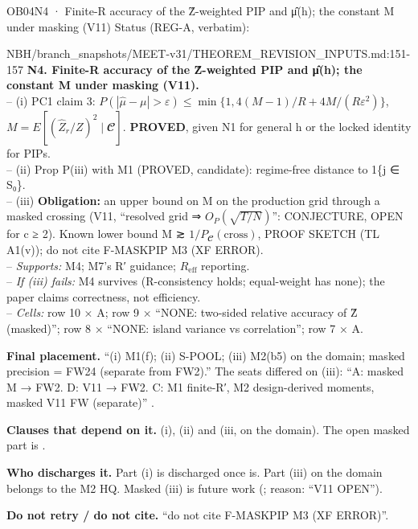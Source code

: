 \begin{card}{OB04}{N4 · Finite-R accuracy of the Ẑ-weighted PIP and μ̂(h); the constant M under masking (V11)}
Status (REG-A, verbatim):  
\begin{stmt}{NBH/branch_snapshots/MEET-v31/THEOREM_REVISION_INPUTS.md:151-157}
\textbf{N4. Finite-R accuracy of the Ẑ-weighted PIP and μ̂(h); the constant M under masking (V11).}\\
– (i) PC1 claim 3: $P(|\hat{μ} − μ| > ε) ≤ \min\{1, 4(M−1)/R + 4M/(Rε^2)\}$, $M = E[(\hat{Z}_r/Z)^2 \mid 𝓒]$. \textbf{PROVED}, given N1 for general h or the locked identity for PIPs.\\
– (ii) Prop P(iii) with M1 (PROVED, candidate): regime-free distance to 1\{j ∈ S₀\}.\\
– (iii) \textbf{Obligation:} an upper bound on M on the production grid through a masked crossing (V11, ``resolved grid ⇒ $O_P(\sqrt{T/N})$'': CONJECTURE, OPEN for c ≥ 2). Known lower bound M ≳ $1/P_{𝓒}(\mathrm{cross})$, PROOF SKETCH (TL A1(v)); do not cite F-MASKPIP M3 (XF ERROR).\\
– \emph{Supports:} M4; M7's R′ guidance; $R_{\mathrm{eff}}$ reporting.\\
– \emph{If (iii) fails:} M4 survives (R-consistency holds; equal-weight has none); the paper claims correctness, not efficiency.\\
– \emph{Cells:} row 10 × A; row 9 × ``NONE: two-sided relative accuracy of Ẑ (masked)''; row 8 × ``NONE: island variance vs correlation''; row 7 × A.
\end{stmt}
\textbf{Final placement.} ``(i) M1(f); (ii) S-POOL; (iii) M2(b5) on the domain; masked precision = FW24 (separate from FW2).'' The seats differed on (iii): ``A: masked M → FW2. D: V11 → FW2. C: M1 finite-R′, M2 design-derived moments, masked V11 FW (separate)'' .

\textbf{Clauses that depend on it.}  (i),  (ii) and  (iii, on the domain). The open masked part is .

\textbf{Who discharges it.} Part (i) is discharged once  is. Part (iii) on the domain belongs to the M2 HQ. Masked (iii) is future work (; reason: ``V11 OPEN'').

\textbf{Do not retry / do not cite.} ``do not cite F-MASKPIP M3 (XF ERROR)''.
\end{card}

